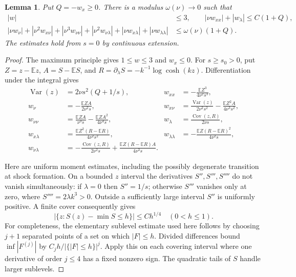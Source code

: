 \documentclass[11pt]{article}
\newtheorem{lemma}{Lemma}
\begin{document}
\begin{lemma}\label{CH}
Put $Q=-w_x\ge0$. There is a modulus $\omega(\nu)\to0$ such that
\begin{align}
 |w|&\le3,\qquad |\nu w_{xx}|+|w_\lambda|\le C(1+Q),\label{CH1}\\
 |\nu w_\nu|+|\nu^2w_{x\nu}|+|\nu^3w_{\nu\nu}|
 +|\nu^2w_{\nu\lambda}|+|\nu w_{x\lambda}|+|\nu w_{\lambda\lambda}|
 &\le\omega(\nu)(1+Q).\label{CH2}
\end{align}
The estimates hold from $s=0$ by continuous extension.
\end{lemma}
\begin{proof}
The maximum principle gives $1\le w\le3$ and $w_x\le0$. For $s\ge s_0>0$, put $Z=z-\mathbb E z$, $A=S-\mathbb E S$, and $R=\partial_\lambda S=-k^{-1}\log\cosh(kz)$. Differentiation under the integral gives
\begin{align*}
 \operatorname{Var}(z)&=2\nu s^2(Q+1/s),&
 w_{xx}&=-\frac{\mathbb E Z^3}{4\nu^2s^3},\\
 w_\nu&=-\frac{\mathbb E ZA}{2\nu^2s},&
 w_{x\nu}&=\frac{\operatorname{Var}(z)}{2\nu^2s^2}-\frac{\mathbb E Z^2A}{4\nu^3s^2},\\
 w_{\nu\nu}&=\frac{\mathbb E ZA}{\nu^3s}-\frac{\mathbb E ZA^2}{4\nu^4s},&
 w_\lambda&=\frac{\operatorname{Cov}(z,R)}{2\nu s},\\
 w_{x\lambda}&=\frac{\mathbb E Z^2(R-\mathbb E R)}{4\nu^2s^2},&
 w_{\lambda\lambda}&=-\frac{\mathbb E Z(R-\mathbb E R)^2}{4\nu^2s},\\
 w_{\nu\lambda}&=-\frac{\operatorname{Cov}(z,R)}{2\nu^2s}
 +\frac{\mathbb E Z(R-\mathbb E R)A}{4\nu^3s}.&&
\end{align*}

Here are uniform moment estimates, including the possibly degenerate transition at shock formation. On a bounded $z$ interval the derivatives $S'',S''',S''''$ do not vanish simultaneously: if $\lambda=0$ then $S''=1/s$; otherwise $S'''$ vanishes only at zero, where $S''''=2\lambda k^3>0$. Outside a sufficiently large interval $S''$ is uniformly positive. A finite cover consequently gives
\[
 |\{z:S(z)-\min S\le h\}|\le C h^{1/4}\quad(0<h\le1).
\]
For completeness, the elementary sublevel estimate used here follows by choosing $j+1$ separated points of a set on which $|F|\le h$. Divided differences bound $\inf|F^{(j)}|$ by $C_jh/|\{|F|\le h\}|^j$. Apply this on each covering interval where one derivative of order $j\le4$ has a fixed nonzero sign. The quadratic tails of $S$ handle larger sublevels.


\end{proof}
\end{document}
